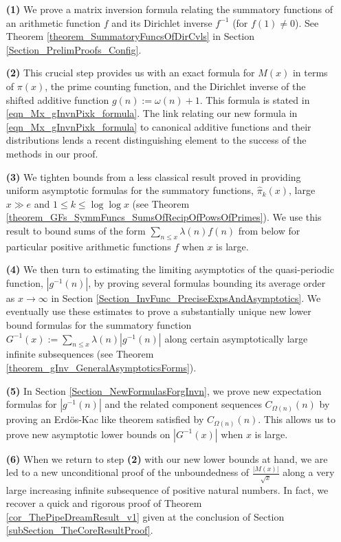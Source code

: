 \documentclass[11pt,reqno,a4letter]{article}
\numberwithin{figure}{section}
\numberwithin{table}{section}
\theoremstyle{plain}
\numberwithin{theorem}{section}
\theoremstyle{definition}
\begin{document}
\begin{itemize} 

\item[\textbf{(1)}] We prove a matrix inversion formula relating the summatory 
           functions of an arithmetic function $f$ and its Dirichlet inverse $f^{-1}$ (for $f(1) \neq 0$). 
           See Theorem \ref{theorem_SummatoryFuncsOfDirCvls} in 
           Section \ref{Section_PrelimProofs_Config}.  
\item[\textbf{(2)}] This crucial step provides us with an exact formula for $M(x)$ in terms of $\pi(x)$, the 
           prime counting function, and the 
           Dirichlet inverse of the shifted additive function $g(n) := \omega(n) + 1$. This 
           formula is stated in \eqref{eqn_Mx_gInvnPixk_formula}. 
           The link relating our new formula in 
           \eqref{eqn_Mx_gInvnPixk_formula} to canonical additive functions and their 
           distributions lends a recent distinguishing element to the 
           success of the methods in our proof. 
\item[\textbf{(3)}] We tighten bounds from a less classical result proved in 
            \cite[\S 7]{MV} providing uniform asymptotic formulas for the  
           summatory functions, $\widehat{\pi}_k(x)$, large $x \gg e$ and 
           $1 \leq k \leq \log\log x$ 
           (see Theorem \ref{theorem_GFs_SymmFuncs_SumsOfRecipOfPowsOfPrimes}). 
           We use this result to bound sums of the form 
           $\sum_{n \leq x} \lambda(n) f(n)$ from below for particular positive arithmetic 
           functions $f$ when $x$ is large. 
\item[\textbf{(4)}] We then turn to estimating the limiting 
           asymptotics of the quasi-periodic function, $|g^{-1}(n)|$, by proving several formulas bounding its 
           average order as $x \rightarrow \infty$ in 
           Section \ref{Section_InvFunc_PreciseExpsAndAsymptotics}. 
           We eventually use these estimates to prove a substantially unique new lower bound formulas 
           for the summatory function 
           $G^{-1}(x) := \sum_{n \leq x} \lambda(n) |g^{-1}(n)|$ 
           along certain asymptotically large 
           infinite subsequences (see Theorem \ref{theorem_gInv_GeneralAsymptoticsForms}). 
\item[\textbf{(5)}] In Section \ref{Section_NewFormulasForgInvn}, 
           we prove new expectation formulas for $|g^{-1}(n)|$ and the related component sequences 
           $C_{\Omega(n)}(n)$ by proving an Erd\"os-Kac like theorem satisfied by $C_{\Omega(n)}(n)$. 
           This allows us to prove new asymptotic lower bounds on $|G^{-1}(x)|$ when $x$ is large. 
\item[\textbf{(6)}] When we return to step \textbf{(2)} 
           with our new lower bounds at hand, we are led to a new unconditional proof of the 
           unboundedness of $\frac{|M(x)|}{\sqrt{x}}$ 
           along a very large increasing infinite subsequence of positive natural numbers. 
           In fact, we recover a quick and rigorous proof of 
           Theorem \ref{cor_ThePipeDreamResult_v1} given at the conclusion of 
           Section \ref{subSection_TheCoreResultProof}. 
           

\end{itemize}
\end{document}
